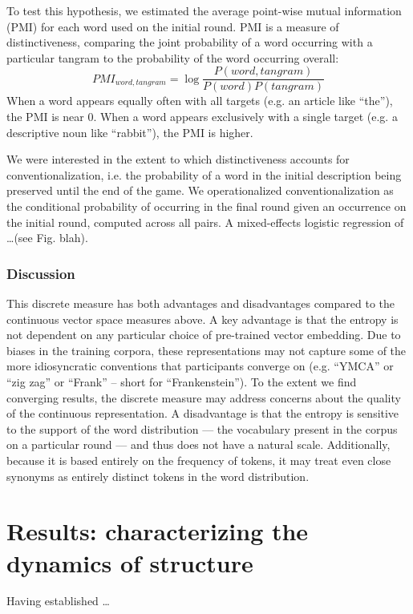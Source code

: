 To test this hypothesis, we estimated the average point-wise mutual information (PMI) for each word used on the initial round. 
PMI is a measure of distinctiveness, comparing the joint probability of a word occurring with a particular tangram to the probability of the word occurring overall: 
$$PMI_{word, tangram} = \log\frac{P(word, tangram)}{P(word)P(tangram)}$$
When a word appears equally often with all targets (e.g. an article like ``the''), the PMI is near 0. 
When a word appears exclusively with a single target (e.g. a descriptive noun like ``rabbit''), the PMI is higher.

We were interested in the extent to which distinctiveness accounts for conventionalization, i.e. the probability of a word in the initial description being preserved until the end of the game. 
We operationalized conventionalization as the conditional probability of occurring in the final round given an occurrence on the initial round, computed across all pairs. 
A mixed-effects logistic regression of \dots (see Fig. blah).

\subsubsection{Discussion}

This discrete measure has both advantages and disadvantages compared to the continuous vector space measures above.
A key advantage is that the entropy is not dependent on any particular choice of pre-trained vector embedding. 
Due to biases in the training corpora, these representations may not capture some of the more idiosyncratic conventions that participants converge on (e.g. ``YMCA'' or ``zig zag'' or ``Frank'' -- short for ``Frankenstein'').
To the extent we find converging results, the discrete measure may address concerns about the quality of the continuous representation.
A disadvantage is that the entropy is sensitive to the support of the word distribution --- the vocabulary present in the corpus on a particular round --- and thus does not have a natural scale.
Additionally, because it is based entirely on the frequency of tokens, it may treat even close synonyms as entirely distinct tokens in the word distribution. 

\section{Results: characterizing the dynamics of structure}\label{results}

Having established \dots

